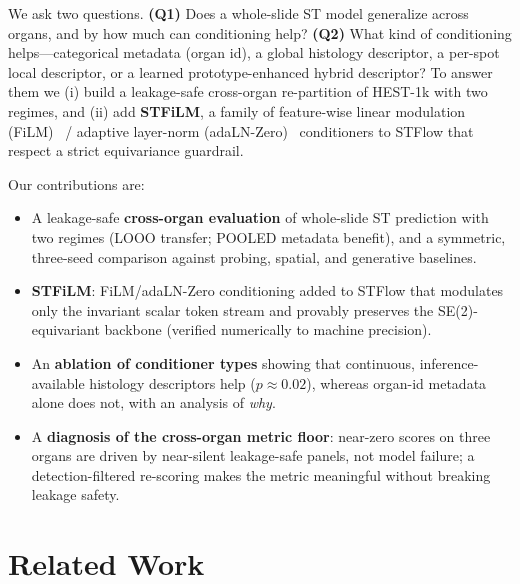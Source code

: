 \documentclass[10pt,twocolumn,letterpaper]{article}
\begin{document}
We ask two questions. \textbf{(Q1)} Does a whole-slide ST model generalize across organs, and
by how much can conditioning help? \textbf{(Q2)} What kind of conditioning helps---categorical
metadata (organ id), a global histology descriptor, a per-spot local descriptor, or a learned
prototype-enhanced hybrid descriptor? To answer them we (i) build a leakage-safe cross-organ
re-partition of HEST-1k with two regimes, and (ii) add \textbf{STFiLM}, a family of
feature-wise linear modulation (FiLM)~\cite{film} / adaptive layer-norm
(adaLN-Zero)~\cite{dit} conditioners to STFlow that respect a strict equivariance guardrail.

Our contributions are:
\begin{itemize}
\item A leakage-safe \textbf{cross-organ evaluation} of whole-slide ST prediction with two
regimes (LOOO transfer; POOLED metadata benefit), and a symmetric, three-seed comparison
against probing, spatial, and generative baselines.
\item \textbf{STFiLM}: FiLM/adaLN-Zero conditioning added to STFlow that modulates only the
invariant scalar token stream and provably preserves the SE(2)-equivariant backbone (verified
numerically to machine precision).
\item An \textbf{ablation of conditioner types} showing that continuous, inference-available
histology descriptors help ($p\!\approx\!0.02$), whereas organ-id metadata alone does not,
with an analysis of \emph{why}.
\item A \textbf{diagnosis of the cross-organ metric floor}: near-zero scores on three organs
are driven by near-silent leakage-safe panels, not model failure; a detection-filtered
re-scoring makes the metric meaningful without breaking leakage safety.
\end{itemize}

\section{Related Work}
\label{sec:related}
\end{document}
